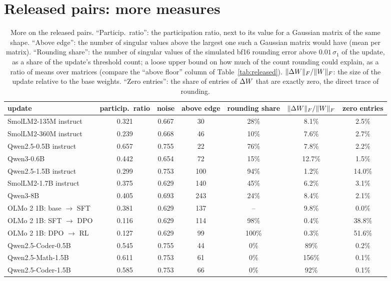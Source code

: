 \section{Released pairs: more measures}
\label{app:released}

\begin{table}[H]
\caption{More on the released pairs. ``Particip.\ ratio'': the participation
ratio, next to its value for a Gaussian matrix of the same shape. ``Above
edge'': the number of singular values above the largest one such a Gaussian
matrix would have (mean per matrix). ``Rounding share'': the number of
singular values of the simulated bf16 rounding error above $0.01\,\sigma_1$ of
the update, as a share of the update's threshold count; a loose upper bound on
how much of the count rounding could explain, as a ratio of means over
matrices (compare the ``above floor'' column of Table~\ref{tab:released}).
$\|\Delta W\|_F/\|W\|_F$: the size of the update relative to the base weights.
``Zero entries'': the share of entries of $\Delta W$ that are exactly zero, the
direct trace of rounding.}
\label{tab:released_more}
\begin{center}
\small
\setlength{\tabcolsep}{4pt}
\begin{tabular}{lcccccc}
\toprule
update & particip.\ ratio & noise & above edge & rounding share & $\|\Delta W\|_F/\|W\|_F$ & zero entries \\
\midrule
SmolLM2-135M instruct & 0.321 & 0.667 & 30  & 28\% & 8.1\%  & 2.5\%  \\
SmolLM2-360M instruct & 0.239 & 0.668 & 46  & 10\% & 7.6\%  & 2.7\%  \\
Qwen2.5-0.5B instruct & 0.657 & 0.755 & 22  & 76\% & 7.8\%  & 2.2\%  \\
Qwen3-0.6B            & 0.442 & 0.654 & 72  & 15\% & 12.7\% & 1.5\%  \\
Qwen2.5-1.5B instruct & 0.299 & 0.753 & 100 & 94\% & 1.2\%  & 14.0\% \\
SmolLM2-1.7B instruct & 0.375 & 0.629 & 140 & 45\% & 6.2\%  & 3.1\%  \\
Qwen3-8B              & 0.405 & 0.693 & 243 & 24\% & 8.4\%  & 2.1\%  \\
OLMo 2 1B: base $\to$ SFT & 0.381 & 0.629 & 137 & --   & 9.8\% & 0.0\%  \\
OLMo 2 1B: SFT $\to$ DPO  & 0.116 & 0.629 & 114 & 98\% & 0.4\% & 38.8\% \\
OLMo 2 1B: DPO $\to$ RL   & 0.127 & 0.629 & 99  & 100\% & 0.3\% & 51.6\% \\
Qwen2.5-Coder-0.5B    & 0.545 & 0.755 & 44  & 0\% & 89\%   & 0.2\%  \\
Qwen2.5-Math-1.5B     & 0.611 & 0.753 & 61  & 0\% & 156\%  & 0.1\%  \\
Qwen2.5-Coder-1.5B    & 0.585 & 0.753 & 66  & 0\% & 92\%   & 0.1\%  \\
\bottomrule
\end{tabular}
\end{center}
\end{table}

